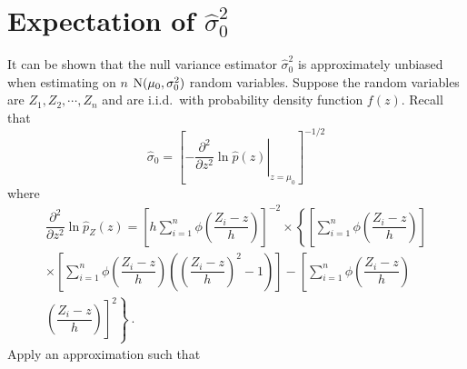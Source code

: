 \chapter{Expectation of $\widehat{\sigma}^2_0$}
\label{chapter:appendix_expectationNullStdEstimator}

It can be shown that the null variance estimator $\widehat{\sigma}_0^2$ is approximately unbiased when estimating on $n$ $\operatorname{N}(\mu_0, \sigma_0^2)$ random variables. Suppose the random variables are $Z_1, Z_2, \cdots, Z_n$ and are i.i.d.~with probability density function $f(z)$. Recall that
\begin{equation}
  \widehat{\sigma}_0 = \left[
    \left.
      -\dfrac{\partial^2}{\partial z^2}\ln\widehat{p}(z)
    \right|_{z=\widehat{\mu}_0}
  \right]^{-1/2}
\end{equation}
where
\begin{multline}
  \dfrac{
    \partial^2
  }
  {
    \partial z^2
  }
  \ln\widehat{p}_Z(z)
  =
  \left[
    h\sum_{i=1}^n
    \phi\left(
      \dfrac{
        Z_i-z
      }
      {
        h
      }
    \right)
  \right]^{-2}
  \times
  \left\{
    \left[
      \sum_{i=1}^n
      \phi\left(
        \dfrac{
          Z_i-z
        }
        {
          h
        }
      \right)
    \right]
  \right.
  \\
  \left.
    \times
    \left[
      \sum_{i=1}^n
      \phi\left(
        \dfrac{
          Z_i-z
        }
        {
          h
        }
      \right)
      \left(
        \left(
          \dfrac{
            Z_i-z
          }
          {
            h
          }
        \right)^2
        -1
      \right)
    \right]
    -
    \left[
      \sum_{i=1}^n
      \phi\left(
        \dfrac{
          Z_i-z
        }
        {
          h
        }
      \right)
    \right.
  \right.
  \\
  \left.
    \left.
      \left(
        \dfrac{
          Z_i-z
        }
        {
          h
        }
      \right)
    \right]^2
  \right\}
  \ .
\end{multline}
Apply an approximation such that

